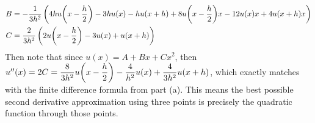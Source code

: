 \documentclass{article} %
\theoremstyle{plain}
\numberwithin{equation}{section} %
\numberwithin{figure}{section} %
\numberwithin{table}{section} %
\begin{document}
\begin{enumerate}[\ \ (a)]
\begin{align*}
            B &= -\frac{1}{3 h^{2}} \left(4 h u\qty(x - \frac{h}{2}) - 3 h u(x) - h u\qty(x + h) + 8 u\qty(x - \frac{h}{2}) x - 12 u(x) x + 4 u\qty(x + h) x\right) \\
            C &= \frac{2}{3 h^{2}} \left(2 u\qty(x - \frac{h}{2}) - 3 u(x) + u\qty(x + h)\right)
        \end{align*}
        Then note that since $u(x) = A + Bx + Cx^2$, then $u''(x) = 2C = \dfrac{8}{3h^2}u\qty(x - \dfrac{h}{2}) - \dfrac{4}{h^2}u(x) + \dfrac{4}{3h^2}u\qty(x + h)$, which exactly matches with the finite difference formula from part (a).  This means the best possible second derivative approximation using three points is precisely the quadratic function through those points.
\end{enumerate}
\end{document}
